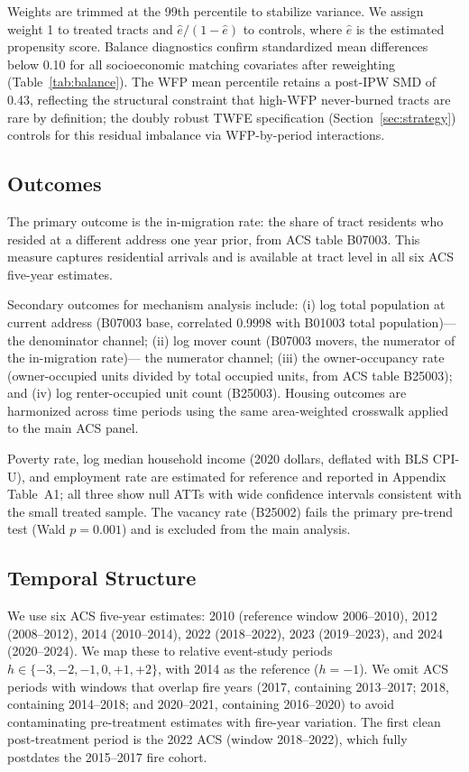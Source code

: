 \documentclass[12pt]{article}
\begin{document}
Weights are trimmed at the 99th percentile to stabilize variance.
We assign weight 1 to treated tracts and $\hat{e} / (1 - \hat{e})$
to controls, where $\hat{e}$ is the estimated propensity score.
Balance diagnostics confirm standardized mean differences below 0.10
for all socioeconomic matching covariates after reweighting
(Table~\ref{tab:balance}).
The WFP mean percentile retains a post-IPW SMD of 0.43, reflecting the
structural constraint that high-WFP never-burned tracts are rare by
definition; the doubly robust TWFE specification (Section~\ref{sec:strategy})
controls for this residual imbalance via WFP-by-period interactions.

\subsection{Outcomes}

The primary outcome is the in-migration rate: the share of tract residents
who resided at a different address one year prior, from ACS table B07003.
This measure captures residential arrivals and is available at tract level
in all six ACS five-year estimates.

Secondary outcomes for mechanism analysis include:
(i) log total population at current address (B07003 base, correlated 0.9998
with B01003 total population)---the denominator channel;
(ii) log mover count (B07003 movers, the numerator of the in-migration rate)---
the numerator channel;
(iii) the owner-occupancy rate (owner-occupied units divided by total
occupied units, from ACS table B25003);
and (iv) log renter-occupied unit count (B25003).
Housing outcomes are harmonized across time periods using the same
area-weighted crosswalk applied to the main ACS panel.

Poverty rate, log median household income (2020 dollars, deflated with
BLS CPI-U), and employment rate are estimated for reference
and reported in Appendix Table~A1; all three show null ATTs
with wide confidence intervals consistent with the small treated sample.
The vacancy rate (B25002) fails the primary pre-trend test
(Wald $p = 0.001$) and is excluded from the main analysis.

\subsection{Temporal Structure}

We use six ACS five-year estimates: 2010 (reference window 2006--2010),
2012 (2008--2012), 2014 (2010--2014), 2022 (2018--2022),
2023 (2019--2023), and 2024 (2020--2024).
We map these to relative event-study periods
$h \in \{-3, -2, -1, 0, +1, +2\}$, with 2014 as the reference ($h = -1$).
We omit ACS periods with windows that overlap fire years
(2017, containing 2013--2017; 2018, containing 2014--2018;
and 2020--2021, containing 2016--2020) to avoid contaminating
pre-treatment estimates with fire-year variation.
The first clean post-treatment period is the 2022 ACS
(window 2018--2022), which fully postdates the 2015--2017 fire cohort.
\end{document}
